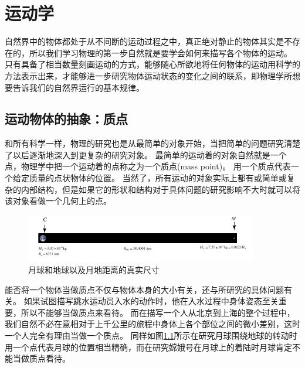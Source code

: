 
\chapter{运动学}

自然界中的物体都处于从不间断的运动过程之中，真正绝对静止的物体其实是不存在的，所以我们学习物理的第一步自然就是要学会如何来描写各个物体的运动。
只有具备了相当数量刻画运动的方式，能够随心所欲地将任何物体的运动用科学的方法表示出来，才能够进一步研究物体运动状态的变化之间的联系，即物理学所想要告诉我们的自然界运行的基本规律。


\section{运动物体的抽象：质点}
和所有科学一样，物理的研究也是从最简单的对象开始，当把简单的问题研究清楚了以后逐渐地深入到更复杂的研究对象。
最简单的运动着的对象自然就是一个点，物理学中把一个运动着的点称之为一个{\heiti 质点}(mass point)。
用一个质点代表一个给定质量的点状物体的位置。
当然了，所有运动的对象实际上都有或简单或复杂的内部结构，但是如果它的形状和结构对于具体问题的研究影响不大时就可以将该对象看做一个几何上的点。


\begin{figure}[htbp]
\begin{center}
\includegraphics[width=0.9\textwidth]{images/motion-moon.pdf} 
\caption{月球和地球以及月地距离的真实尺寸}
\label{fig: 月球和地球以及月地距离的真实尺寸}
\end{center}
\end{figure}



能否将一个物体当做质点不仅与物体本身的大小有关，还与所研究的具体问题有关。
如果试图描写跳水运动员入水的动作时，他在入水过程中身体姿态至关重要，所以不能够当做质点来看待。
而在描写一个人从北京到上海的整个过程中，我们自然不必在意相对于上千公里的旅程中身体上各个部位之间的微小差别，这时一个人完全有理由当做一个质点。
同样如图\ref{fig: 月球和地球以及月地距离的真实尺寸}所示在研究月球围绕地球的转动时用一个点代表月球的位置相当精确，而在研究嫦娥号在月球上的着陆时月球肯定不能当做质点看待。



